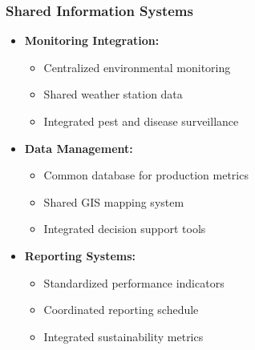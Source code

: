 \subsubsection{Shared Information Systems}
\begin{itemize}
    \item \textbf{Monitoring Integration:}
    \begin{itemize}
        \item Centralized environmental monitoring
        \item Shared weather station data
        \item Integrated pest and disease surveillance
    \end{itemize}
    \item \textbf{Data Management:}
    \begin{itemize}
        \item Common database for production metrics
        \item Shared GIS mapping system
        \item Integrated decision support tools
    \end{itemize}
    \item \textbf{Reporting Systems:}
    \begin{itemize}
        \item Standardized performance indicators
        \item Coordinated reporting schedule
        \item Integrated sustainability metrics
    \end{itemize}
\end{itemize}


